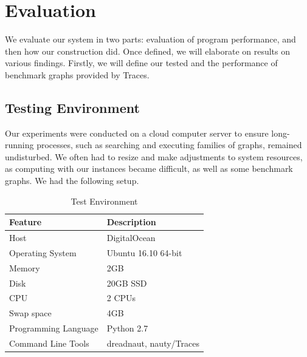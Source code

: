 \chapter{Evaluation}

\ifpdf
    \graphicspath{{Chapter3/Figs/Raster/}{Chapter3/Figs/PDF/}{Chapter3/Figs/}}
\else
    \graphicspath{{Chapter3/Figs/Vector/}{Chapter3/Figs/}}
\fi
We evaluate our system in two parts: evaluation of program performance, and then how our construction did. Once defined, we will elaborate on results on various findings. Firstly, we will define our tested and the performance of benchmark graphs provided by Traces.


\section{Testing Environment}
Our experiments were conducted on a cloud computer server to ensure long-running processes, such as searching and executing families of graphs, remained undisturbed. We often had to resize and make adjustments to system resources, as computing with our instances became difficult, as well as some benchmark graphs. We had the following setup.

\begin{table}[h]
	\caption{Test Environment}
	\centering
	\label{table:test_env}
	\begin{tabular}{l l}
		\toprule
		Feature & Description  \\ 
		\midrule
		Host & DigitalOcean \\
		Operating System & Ubuntu 16.10 64-bit \\
		Memory & 2GB \\
		Disk & 20GB SSD \\
		CPU & 2 CPUs \\
		Swap space & 4GB \\
		Programming Language &  Python 2.7\\
		Command Line Tools & dreadnaut, nauty/Traces \\
		\bottomrule
	\end{tabular}
\end{table}

